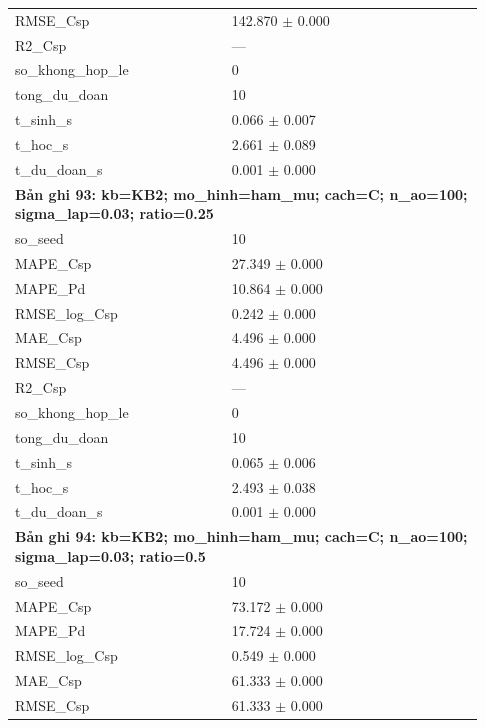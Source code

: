 \begin{longtable}{p{0.43\linewidth}p{0.50\linewidth}}
RMSE\_\allowbreak Csp & 142.870 $\pm$ 0.000 \\
R2\_\allowbreak Csp & — \\
so\_\allowbreak khong\_\allowbreak hop\_\allowbreak le & 0 \\
tong\_\allowbreak du\_\allowbreak doan & 10 \\
t\_\allowbreak sinh\_\allowbreak s & 0.066 $\pm$ 0.007 \\
t\_\allowbreak hoc\_\allowbreak s & 2.661 $\pm$ 0.089 \\
t\_\allowbreak du\_\allowbreak doan\_\allowbreak s & 0.001 $\pm$ 0.000 \\
\midrule
\multicolumn{2}{p{0.95\linewidth}}{\textbf{Bản ghi 93: kb=KB2; mo\_hinh=ham\_mu; cach=C; n\_ao=100; sigma\_lap=0.03; ratio=0.25}} \\
so\_\allowbreak seed & 10 \\
MAPE\_\allowbreak Csp & 27.349 $\pm$ 0.000 \\
MAPE\_\allowbreak Pd & 10.864 $\pm$ 0.000 \\
RMSE\_\allowbreak log\_\allowbreak Csp & 0.242 $\pm$ 0.000 \\
MAE\_\allowbreak Csp & 4.496 $\pm$ 0.000 \\
RMSE\_\allowbreak Csp & 4.496 $\pm$ 0.000 \\
R2\_\allowbreak Csp & — \\
so\_\allowbreak khong\_\allowbreak hop\_\allowbreak le & 0 \\
tong\_\allowbreak du\_\allowbreak doan & 10 \\
t\_\allowbreak sinh\_\allowbreak s & 0.065 $\pm$ 0.006 \\
t\_\allowbreak hoc\_\allowbreak s & 2.493 $\pm$ 0.038 \\
t\_\allowbreak du\_\allowbreak doan\_\allowbreak s & 0.001 $\pm$ 0.000 \\
\midrule
\multicolumn{2}{p{0.95\linewidth}}{\textbf{Bản ghi 94: kb=KB2; mo\_hinh=ham\_mu; cach=C; n\_ao=100; sigma\_lap=0.03; ratio=0.5}} \\
so\_\allowbreak seed & 10 \\
MAPE\_\allowbreak Csp & 73.172 $\pm$ 0.000 \\
MAPE\_\allowbreak Pd & 17.724 $\pm$ 0.000 \\
RMSE\_\allowbreak log\_\allowbreak Csp & 0.549 $\pm$ 0.000 \\
MAE\_\allowbreak Csp & 61.333 $\pm$ 0.000 \\
RMSE\_\allowbreak Csp & 61.333 $\pm$ 0.000 \\

\end{longtable}
